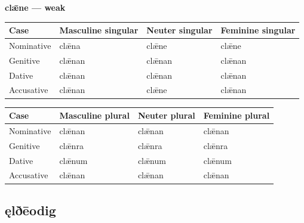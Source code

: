 \textbf{clǣne — weak}

\par\begingroup
\fontsize{10.5}{13.2}\selectfont
\setlength{\LTleft}{0pt}\setlength{\LTright}{\fill}
\noindent
\begin{tabular}{@{}>{\raggedright\arraybackslash}p{22.0mm}>{\raggedright\arraybackslash}p{31.188mm}>{\raggedright\arraybackslash}p{31.188mm}>{\raggedright\arraybackslash}p{31.188mm}@{}}
\toprule
\textbf{Case} & \textbf{Masculine singular} & \textbf{Neuter singular} & \textbf{Feminine singular} \\
\midrule
Nominative & clǣna & clǣne & clǣne \\
Genitive & clǣnan & clǣnan & clǣnan \\
Dative & clǣnan & clǣnan & clǣnan \\
Accusative & clǣnan & clǣne & clǣnan \\
\bottomrule
\end{tabular}
\par\endgroup
\par\addvspace{5pt}
\par\begingroup
\fontsize{10.5}{13.2}\selectfont
\setlength{\LTleft}{0pt}\setlength{\LTright}{\fill}
\noindent
\begin{tabular}{@{}>{\raggedright\arraybackslash}p{22.0mm}>{\raggedright\arraybackslash}p{31.188mm}>{\raggedright\arraybackslash}p{31.188mm}>{\raggedright\arraybackslash}p{31.188mm}@{}}
\toprule
\textbf{Case} & \textbf{Masculine plural} & \textbf{Neuter plural} & \textbf{Feminine plural} \\
\midrule
Nominative & clǣnan & clǣnan & clǣnan \\
Genitive & clǣnra & clǣnra & clǣnra \\
Dative & clǣnum & clǣnum & clǣnum \\
Accusative & clǣnan & clǣnan & clǣnan \\
\bottomrule
\end{tabular}
\par\endgroup

\subsection*{ęlðēodig}


